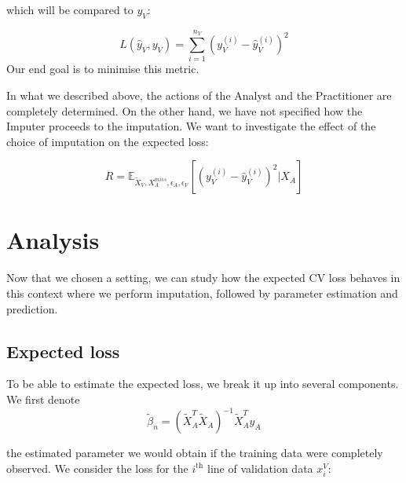 which will be compared to $y_V$:

$$L(\hat{y}_V, y_V) = \sum\limits_{i=1}^{n_V} (y_V^{(i)} - \hat{y}_V^{(i)})^2$$
Our end goal is to minimise this metric. 

In what we described above, the actions of the Analyst and the Practitioner are completely determined. On the other hand, we have not specified how the Imputer proceeds to the imputation. We want to investigate the effect of the choice of imputation on the expected loss:

$$R = \mathbb{E}_{\tilde{X}_V, X_A^{miss}, \epsilon_A, \epsilon_V}[(y_V^{(i)} - \hat{y}_V^{(i)})^2 \vert X_A]$$ %

	\section{Analysis}
	\label{linreg.analysis}
Now that we chosen a setting, we can study how the expected CV loss behaves in this context where we perform imputation, followed by parameter estimation and prediction.

		\subsection{Expected loss}
To be able to estimate the expected loss, we break it up into several components. We first denote 
$$
\tilde{\beta}_n = (\tilde{X}_A^T \tilde{X}_A)^{-1} \tilde{X}_A^T y_A 
$$

the estimated parameter we would obtain if the training data were completely observed. We consider the loss for the $i^{\text{th}}$ line of validation data $x_i^V$:

